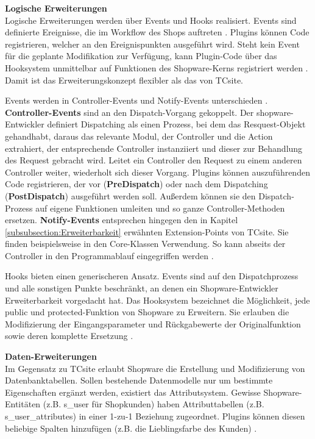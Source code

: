 \documentclass[12pt,a4paper,bibliography=totocnumbered,listof=totoc]{scrartcl}
\begin{document}
\textbf{Logische Erweiterungen}\\
Logische Erweiterungen werden über Events und Hooks realisiert. Events sind \glqq definierte Ereignisse, die im Workflow des Shops auftreten\grqq{} \citep{shopware4Docs}. Plugins können Code registrieren, welcher an den Ereignispunkten ausgeführt wird. Steht kein Event für die geplante Modifikation zur Verfügung, kann Plugin-Code über das Hooksystem unmittelbar auf Funktionen des Shopware-Kerns registriert werden \citep{shopware5Docs}. Damit ist das Erweiterungskonzept flexibler als das von TCsite.

Events werden in Controller-Events und Notify-Events unterschieden \citep{shopware4Docs}. \textbf{Controller-Events} sind an den Dispatch-Vorgang gekoppelt. Der shopware-Entwickler \citet{noegel15Diaspatch} definiert Dispatching als einen Prozess, bei dem das Resquest-Objekt gehandhabt, daraus das relevante Modul, der Controller und die Action extrahiert, der entsprechende Controller instanziiert und dieser zur Behandlung des Request gebracht wird. Leitet ein Controller den Request zu einem anderen Controller weiter, wiederholt sich dieser Vorgang. Plugins können auszuführenden Code registrieren, der vor (\textbf{PreDispatch}) oder nach dem Dispatching (\textbf{PostDispatch}) ausgeführt werden soll. Außerdem können sie den Dispatch-Prozess auf eigene Funktionen umleiten und so ganze Controller-Methoden ersetzen. \textbf{Notify-Events} entsprechen hingegen den in Kapitel \ref{subsubsection:Erweiterbarkeit} erwähnten Extension-Points von TCsite. Sie finden beispielsweise in den Core-Klassen Verwendung. So kann abseits der Controller in den Programmablauf eingegriffen werden \citep{shopware4Docs}.

Hooks bieten einen generischeren Ansatz. Events sind auf den Dispatchprozess und alle sonstigen Punkte beschränkt, an denen ein Shopware-Entwickler Erweiterbarkeit vorgedacht hat. Das Hooksystem bezeichnet die Möglichkeit, jede public und protected-Funktion von Shopware zu Erweitern. Sie erlauben die Modifizierung der Eingangsparameter und Rückgabewerte der Originalfunktion sowie deren komplette Ersetzung \citet{noegel15Hooks}.

\textbf{Daten-Erweiterungen}\\
Im Gegensatz zu TCsite erlaubt Shopware die Erstellung und Modifizierung von Datenbanktabellen. Sollen bestehende Datenmodelle nur um bestimmte Eigenschaften ergänzt werden, existiert das Attributsystem. Gewisse Shopware-Entitäten (z.B. s\_user für Shopkunden) haben Attributtabellen (z.B. s\_user\_attributes) in einer 1-zu-1 Beziehung zugeordnet. Plugins können diesen beliebige Spalten hinzufügen (z.B. die Lieblingsfarbe des Kunden) \citep{shopware5Docs}.
\end{document}
